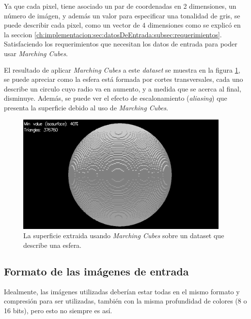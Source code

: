 Ya que cada pixel, tiene asociado un par de coordenadas en 2 dimensiones, un número de imágen, y además un valor para especificar una tonalidad de gris, se puede describir cada pixel, como un vector de 4 dimensiones como se explicó en la seccion \ref{ch:implementacion:sec:datosDeEntrada:subsec:requerimientos}. Satisfaciendo los requerimientos que necesitan los datos de entrada para poder usar \emph{Marching Cubes}.

El resultado de aplicar \emph{Marching Cubes} a este \emph{dataset} se muestra en la figura \ref{f:implementacion:ImSphRad100:screenshot_40}, se puede apreciar como la esfera está formada por cortes transversales, cada uno describe un circulo cuyo radio va en aumento, y a medida que se acerca al final, disminuye. Además, se puede ver el efecto de escalonamiento (\emph{aliasing}) que presenta la superficie debido al uso de \emph{Marching Cubes}.

\begin{figure}[hbt]
	\centering
	\includegraphics[width=0.95\textwidth]
	{images/results/ImSphRad100/screenshot_40.png}
	\caption{La superficie extraida usando \emph{Marching Cubes} sobre un dataset que describe una esfera.}
	\label{f:implementacion:ImSphRad100:screenshot_40}
\end{figure}

\subsection{Formato de las imágenes de entrada}
\label{ch:implementacion:sec:datosDeEntrada:subsec:formatodelasimagenesdeentrada}

Idealmente, las imágenes utilizadas deberían estar todas en el mismo formato y compresión para ser utilizadas, también con la misma profundidad de colores (8 o 16 bits), pero esto no siempre es así.

